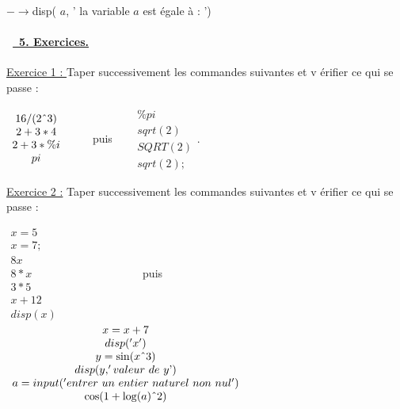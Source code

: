 \documentclass{article}
\begin{document}
$-\rightarrow $disp( $a$, ' la variable $a$ est \'{e}gale \`{a} : ')

\bigskip

\bigskip

\bigskip

\bigskip

\bigskip

\paragraph{ \ \protect\underline{\ 5. Exercices.}\ \ \ \ \ \ \ \ \ \ \ \ \ \
\ \ \ \ \ \ \ \ \ \ \ \ \ \ \ \ \ }

\underline{Exercice 1 : }Taper successivement les commandes suivantes et v%
\'{e}rifier ce qui se passe :

$%
\begin{array}{c}
16/(2\symbol{94}3) \\ 
2+3\ast 4 \\ 
2+3\ast \%i \\ 
pi%
\end{array}%
$ \ \ \ \ puis \ \ \ $%
\begin{array}{c}
\%pi \\ 
sqrt(2) \\ 
SQRT(2) \\ 
sqrt(2);%
\end{array}%
.$

\underline{Exercice 2 :} Taper successivement les commandes suivantes et v%
\'{e}rifier ce qui se passe :

$%
\begin{array}{c}
x=5 \\ 
x=7; \\ 
8x \\ 
8\ast x \\ 
3\ast 5 \\ 
x+12 \\ 
disp(x)%
\end{array}%
$ \ \ \ \ \ \ \ \ \ \ \ \ \ \ puis \ \ \ \ \ $%
\begin{array}{c}
x=x+7 \\ 
disp(^{\prime }x^{\prime }) \\ 
y=\sin (x\symbol{94}3) \\ 
disp(y,^{\prime }valeur\text{ }de\text{ }y\text{'}) \\ 
a=input(^{\prime }entrer\text{ }un\text{ }entier\text{ }naturel\text{ }non%
\text{ }nul^{\prime }) \\ 
\cos (1+\log (a)\symbol{94}2)%
\end{array}%
$
\end{document}
